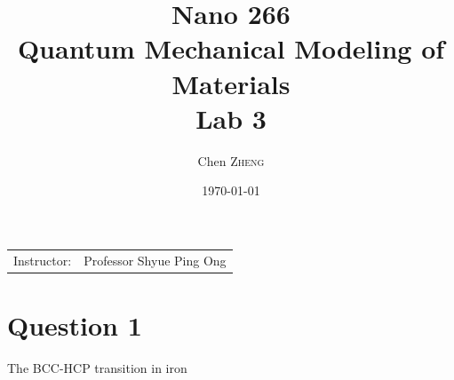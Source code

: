 \documentclass{article}
\title{Nano 266 \\ Quantum Mechanical Modeling of Materials \\ Lab 3} %
\author{Chen \textsc{Zheng}} %
\date{\today} %
\begin{document}
\maketitle %

\begin{center}
\begin{tabular}{l r}
Instructor: & Professor Shyue Ping Ong %
\end{tabular}
\end{center}



\section{Question 1}

The BCC-HCP transition in iron
\end{document}
